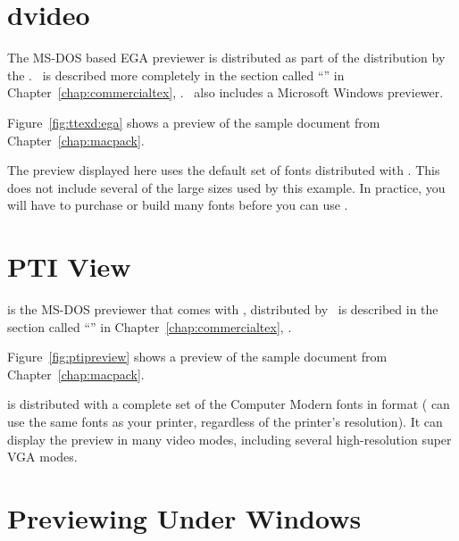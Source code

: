 \section{dvideo}

The MS-DOS based EGA 
previewer  
is distributed as part
of the  distribution by the 
.  
\TurboTeX\ is described more completely
in the section called ``'' in 
Chapter~\ref{chap:commercialtex}, {\it {}}.
\TurboTeX\ also includes a Microsoft Windows previewer.

Figure~\ref{fig:ttexd:ega}
shows a  preview of the sample
document from Chapter~\ref{chap:macpack}.  

%

The preview displayed here uses the default set of fonts distributed
with \TurboTeX.  This does not include several of the large sizes used
by this example.  In practice, you will have to purchase or build many
fonts before you can use \TurboTeX.

\newpage
\section{PTI View}

%
is the MS-DOS previewer that comes with \PCTeX,
distributed by 
\PCTeX\ is described in the section called ``''
in Chapter~\ref{chap:commercialtex}, \textit{}.

Figure~\ref{fig:ptipreview}
shows a  preview of the
sample document from Chapter~\ref{chap:macpack}.


 is distributed with a complete set of the Computer
Modern fonts in  format ( can use the same
 fonts as your printer, regardless of the printer's
resolution).  It can display the preview in many video modes,
including several high-resolution super VGA modes.

\newpage
\section{Previewing Under Windows}

